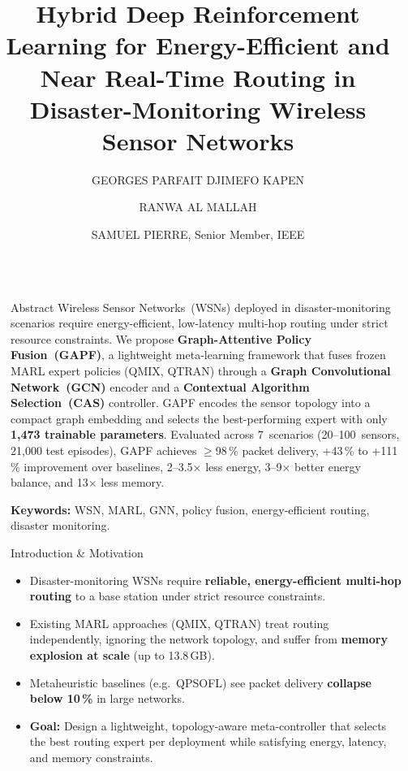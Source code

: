 \documentclass[final]{beamer}
\title{Hybrid Deep Reinforcement Learning for Energy-Efficient and Near Real-Time Routing in Disaster-Monitoring Wireless Sensor Networks}
\author{\uppercase{Georges Parfait Djimefo Kapen} \inst{1} \and
\uppercase{Ranwa Al Mallah} \inst{1} \and
\uppercase{Samuel Pierre}, Senior Member, IEEE \inst{1}}
\institute[shortinst]{Mobile Computing and Networking Research Laboratory (LARIM), Department of Computer and Software Engineering, Polytechnique Montr\'{e}al, Montreal,
QC H3T 1J4, Canada}
\newlength{\sepwidth}
\newlength{\colwidth}
\newcommand{\separatorcolumn}{\begin{column}{\sepwidth}\end{column}}
\begin{document}
\begin{frame}[t]
\begin{columns}[t]
\separatorcolumn

\begin{column}{\colwidth}

  \begin{block}{Abstract}
    Wireless Sensor Networks~(WSNs) deployed in disaster-monitoring scenarios require energy-efficient, low-latency multi-hop routing under strict resource constraints.
    We propose \textbf{Graph-Attentive Policy Fusion~(GAPF)}, a lightweight meta-learning framework that fuses frozen MARL expert policies (QMIX, QTRAN) through a \textbf{Graph Convolutional Network~(GCN)} encoder and a \textbf{Contextual Algorithm Selection~(CAS)} controller.
    GAPF encodes the sensor topology into a compact graph embedding and selects the best-performing expert with only \textbf{1,473 trainable parameters}.
    Evaluated across 7~scenarios (20--100~sensors, 21,000 test episodes), GAPF achieves $\geq$98\,\% packet delivery, +43\,\% to +111\,\% improvement over baselines, 2--3.5$\times$ less energy, 3--9$\times$ better energy balance, and 13$\times$ less memory.

    \smallskip
    \textbf{Keywords:} WSN, MARL, GNN, policy fusion, energy-efficient routing, disaster monitoring.
  \end{block}

  \begin{block}{Introduction \& Motivation}
    \begin{itemize}
      \item Disaster-monitoring WSNs require \textbf{reliable, energy-efficient multi-hop routing} to a base station under strict resource constraints.
      \item Existing MARL approaches (QMIX, QTRAN) treat routing independently, ignoring the network topology, and suffer from \textbf{memory explosion at scale} (up to 13.8\,GB).
      \item Metaheuristic baselines (e.g.\ QPSOFL) see packet delivery \textbf{collapse below 10\,\%} in large networks.
      \item \textbf{Goal:} Design a lightweight, topology-aware meta-controller that selects the best routing expert per deployment while satisfying energy, latency, and memory constraints.
    \end{itemize}
  \end{block}


\end{column}
\end{columns}
\end{frame}
\end{document}

